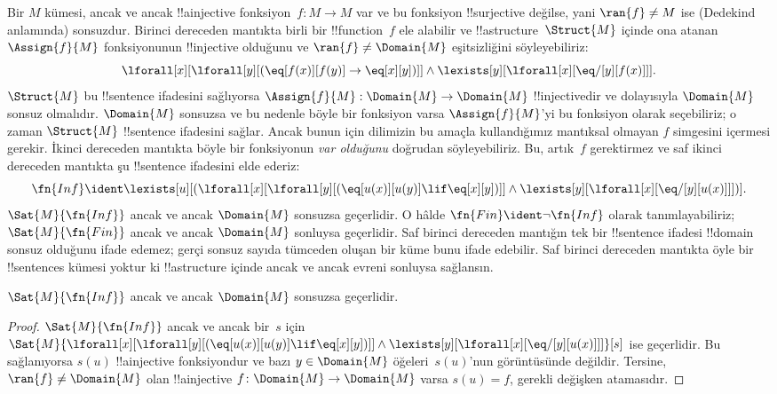 



Bir $M$ kümesi, ancak ve ancak !!a{injective} fonksiyon~$f\colon M \to M$
var ve bu fonksiyon !!{surjective} değilse, yani $\ran{f} \neq M$ ise
(Dedekind anlamında) sonsuzdur. Birinci dereceden mantıkta birli bir
!!{function}~$f$ ele alabilir ve !!a{structure}~$\Struct{M}$ içinde ona
atanan~$\Assign{f}{M}$ fonksiyonunun !!{injective} olduğunu ve
$\ran{f} \neq \Domain{M}$ eşitsizliğini söyleyebiliriz:
\[
\lforall[x][\lforall[y][(\eq[f(x)][f(y)] \to \eq[x][y])]] \land
\lexists[y][\lforall[x][\eq/[y][f(x)]]].
\]
$\Struct{M}$ bu !!{sentence} ifadesini sağlıyorsa
$\Assign{f}{M}: \Domain{M} \to \Domain{M}$ !!{injective}{}dir ve
dolayısıyla $\Domain{M}$ sonsuz olmalıdır. $\Domain{M}$ sonsuzsa ve bu
nedenle böyle bir fonksiyon varsa $\Assign{f}{M}$'yi bu fonksiyon olarak
seçebiliriz; o zaman $\Struct{M}$ !!{sentence} ifadesini sağlar. Ancak bunun
için dilimizin bu amaçla kullandığımız mantıksal olmayan $f$ simgesini
içermesi gerekir. İkinci dereceden mantıkta böyle bir fonksiyonun
\emph{var olduğunu} doğrudan söyleyebiliriz. Bu, artık~$f$ gerektirmez ve
saf ikinci dereceden mantıkta şu !!{sentence} ifadesini elde ederiz:
\[
\fn{Inf} \ident \lexists[u][(\lforall[x][\lforall[y][(\eq[u(x)][u(y)]
      \lif \eq[x][y])]] \land \lexists[y][\lforall[x][\eq/[y][u(x)]]])].
\]
$\Sat{M}{\fn{Inf}}$ ancak ve ancak $\Domain{M}$ sonsuzsa geçerlidir.
O hâlde $\fn{Fin} \ident \lnot \fn{Inf}$ olarak tanımlayabiliriz;
$\Sat{M}{\fn{Fin}}$ ancak ve ancak $\Domain{M}$ sonluysa geçerlidir.
Saf birinci dereceden mantığın tek bir !!{sentence} ifadesi !!{domain}
sonsuz olduğunu ifade edemez; gerçi sonsuz sayıda tümceden oluşan bir küme
bunu ifade edebilir. Saf birinci dereceden mantıkta öyle bir !!{sentence}s
kümesi yoktur ki !!a{structure} içinde ancak ve ancak evreni sonluysa sağlansın.

\begin{prop}
$\Sat{M}{\fn{Inf}}$ ancak ve ancak $\Domain{M}$ sonsuzsa geçerlidir.
\end{prop}

\begin{proof}
$\Sat{M}{\fn{Inf}}$ ancak ve ancak bir~$s$ için
  $\Sat{M}{\lforall[x][\lforall[y][(\eq[u(x)][u(y)] \lif \eq[x][y])]]
    \land \lexists[y][\lforall[x][\eq/[y][u(x)]]]}[s]$ ise geçerlidir.
  Bu sağlanıyorsa $s(u)$ !!a{injective} fonksiyondur ve bazı
  $y \in \Domain{M}$ öğeleri~$s(u)$'nun görüntüsünde değildir. Tersine,
  $\ran{f} \neq \Domain{M}$ olan !!a{injective}
  $f\colon \Domain{M} \to \Domain{M}$ varsa $s(u)=f$, gerekli değişken
  atamasıdır.
\end{proof}

